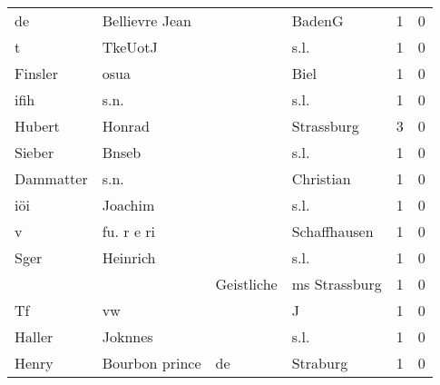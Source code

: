 \begin{center}
\begin{tiny}
\begin{longtabu}{llllrr}
                       de &                     Bellievre Jean &             &                                      BadenG &          1 &         0 \\
                        t &                            TkeUotJ &             &                                        s.l. &          1 &         0 \\
                  Finsler &                               osua &             &                                        Biel &          1 &         0 \\
                     ifih &                               s.n. &             &                                        s.l. &          1 &         0 \\
                   Hubert &                             Honrad &             &                                  Strassburg &          3 &         0 \\
                   Sieber &                              Bnseb &             &                                        s.l. &          1 &         0 \\
                Dammatter &                               s.n. &             &                                   Christian &          1 &         0 \\
                      iöi &                            Joachim &             &                                        s.l. &          1 &         0 \\
                        v &                         fu. r e ri &             &                                Schaffhausen &          1 &         0 \\
                     Sger &                           Heinrich &             &                                        s.l. &          1 &         0 \\
                          &                                    &  Geistliche &                               ms Strassburg &          1 &         0 \\
                       Tf &                                 vw &             &                                           J &          1 &         0 \\
                   Haller &                            Joknnes &             &                                        s.l. &          1 &         0 \\
                    Henry &                     Bourbon prince &          de &                                    Straburg &          1 &         0 \\

\end{longtabu}
\end{tiny}
\end{center}
